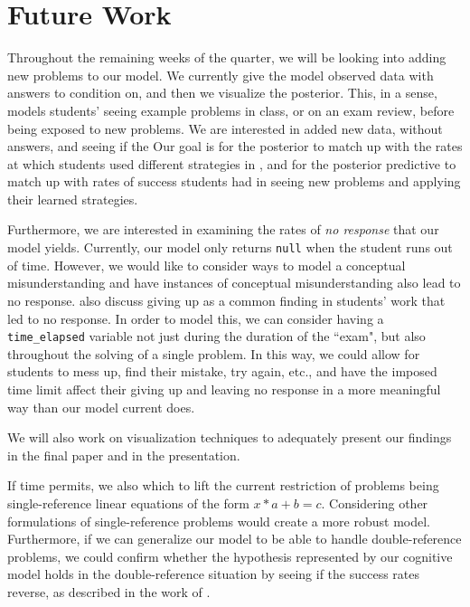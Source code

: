 \documentclass[10pt,letterpaper]{article}
\newcommand\TODO[1]{\textcolor{red}{#1}}
\begin{document}
	
	\section{Future Work}
	Throughout the remaining weeks of the quarter, we will be looking into adding new problems to our model. We currently give the model observed data with answers to condition on, and then we visualize the posterior. This, in a sense, models students' seeing example problems in class, or on an exam review, before being exposed to new problems. We are interested in added new data, without answers, and seeing if the 
	Our goal is for the posterior to match up with the rates at which students used different strategies in \cite{KoedNath2004, KoedNath2008}, and for the posterior predictive to match up with rates of success students had in seeing new problems and applying their learned strategies. 
	
	Furthermore, we are interested in examining the rates of \textit{no response} that our model yields. Currently, our model only returns \verb|null| when the student runs out of time. However, we would like to consider ways to model a conceptual misunderstanding and have instances of conceptual misunderstanding also lead to no response.  also discuss giving up as a common finding in students' work that led to no response. In order to model this, we can consider having a \verb|time_elapsed| variable not just during the duration of the ``exam", but also throughout the solving of a single problem. In this way, we could allow for students to mess up, find their mistake, try again, etc., and have the imposed time limit affect their giving up and leaving no response in a more meaningful way than our model current does.
	
	We will also work on visualization techniques to adequately present our findings in the final paper and in the presentation.
	
	If time permits, we also which to lift the current restriction of problems being single-reference linear equations of the form $x*a+b=c$. Considering other formulations of single-reference problems would create a more robust model. Furthermore, if we can generalize our model to be able to handle double-reference problems, we could confirm whether the hypothesis represented by our cognitive model holds in the double-reference situation by seeing if the success rates reverse, as described in the work of .
	
\end{document}
